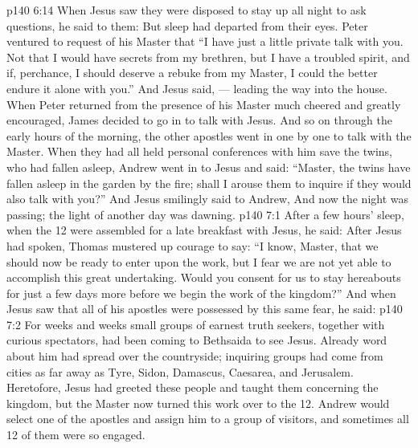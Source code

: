 \vs p140 6:14 When Jesus saw they were disposed to stay up all night to ask questions, he said to them:  But sleep had departed from their eyes. Peter ventured to request of his Master that “I have just a little private talk with you. Not that I would have secrets from my brethren, but I have a troubled spirit, and if, perchance, I should deserve a rebuke from my Master, I could the better endure it alone with you.” And Jesus said,  --- leading the way into the house. When Peter returned from the presence of his Master much cheered and greatly encouraged, James decided to go in to talk with Jesus. And so on through the early hours of the morning, the other apostles went in one by one to talk with the Master. When they had all held personal conferences with him save the twins, who had fallen asleep, Andrew went in to Jesus and said: “Master, the twins have fallen asleep in the garden by the fire; shall I arouse them to inquire if they would also talk with you?” And Jesus smilingly said to Andrew,  And now the night was passing; the light of another day was dawning.
\vs p140 7:1 After a few hours’ sleep, when the 12 were assembled for a late breakfast with Jesus, he said:  After Jesus had spoken, Thomas mustered up courage to say: “I know, Master, that we should now be ready to enter upon the work, but I fear we are not yet able to accomplish this great undertaking. Would you consent for us to stay hereabouts for just a few days more before we begin the work of the kingdom?” And when Jesus saw that all of his apostles were possessed by this same fear, he said: 
\vs p140 7:2 \pc For weeks and weeks small groups of earnest truth seekers, together with curious spectators, had been coming to Bethsaida to see Jesus. Already word about him had spread over the countryside; inquiring groups had come from cities as far away as Tyre, Sidon, Damascus, Caesarea, and Jerusalem. Heretofore, Jesus had greeted these people and taught them concerning the kingdom, but the Master now turned this work over to the 12. Andrew would select one of the apostles and assign him to a group of visitors, and sometimes all 12 of them were so engaged.
